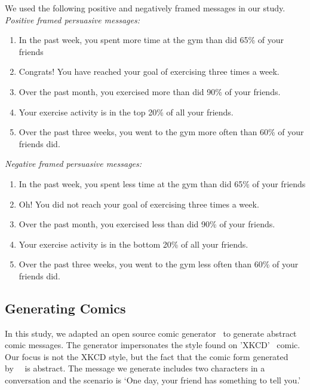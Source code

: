 We used the following positive and negatively framed messages in our study.
\textit{Positive framed persuasive messages:}
\begin{enumerate}
	\item In the past week, you spent more time at the gym than did 65\% of your friends
	\item Congrats! You have reached your goal of exercising three times a week.
	\item Over the past month, you exercised more than did 90\% of your friends.
	\item Your exercise activity is in the top 20\% of all your friends.
	\item Over the past three weeks, you went to the gym more often than 60\% of your friends did.
\end{enumerate}\par
\textit{Negative framed persuasive messages:}
\begin{enumerate}
	\item	In the past week, you spent less time at the gym than did 65\% of your friends
	\item  Oh! You did not reach your goal of exercising three times a week.
	\item	Over the past month, you exercised less than did 90\% of your friends.
	\item	Your exercise activity is in the bottom 20\% of all your friends.
	\item	Over the past three weeks, you went to the gym less often than 60\% of your friends did.
\end{enumerate}

\subsection{Generating Comics}
In this study, we adapted an open source comic generator~\cite{cmx.io} to generate abstract comic messages. The generator impersonates the style found on 'XKCD'~\cite{munroe2009xkcd} comic. Our focus is not the XKCD style, but the fact that the comic form generated by~~\cite{cmx.io} is abstract. The message we generate includes two characters in a conversation and the scenario is `One day, your friend has something to tell you.'

